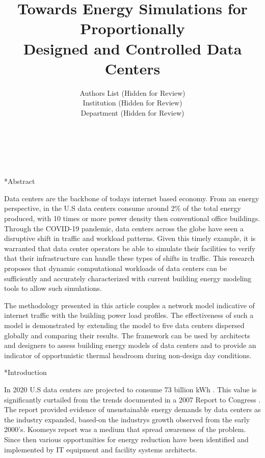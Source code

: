 \documentclass[twocolumn, a4paper,10pt]{article}
\title{%
Towards Energy Simulations for Proportionally  \\	%
\vspace{4pt}
Designed and Controlled Data Centers %
}
\author{
Authors List (Hidden for Review)\\ %
Institution (Hidden for Review) \\ %
Department (Hidden for Review)\\ %
  \\%
  \\ %
  \\ %
}
\date{\vspace{-0.5cm}}	%
\makeatletter
\renewcommand\section{\@startsection{section}{1}{\z@}{0.25cm}{0.1cm}{\normalfont\large\bfseries}}
\makeatother
\begin{document}
\maketitle

\section*{Abstract}	%

\addtocounter{section}{1}
Data centers are the backbone of today\textsc{}s internet based economy. From an energy perspective, in the U.S data centers consume around 2\% of the total energy produced, with 10 times or more power density then conventional office buildings. Through the COVID-19 pandemic, data centers across the globe have seen a disruptive shift in traffic and workload patterns. Given this timely example, it is warranted that data center operators be able to simulate their facilities to verify that their infrastructure can handle these types of shifts in traffic. This research proposes that dynamic computational workloads of data centers can be sufficiently and accurately characterized with current building energy modeling tools to allow such simulations.

The methodology presented in this article couples a network model indicative of internet traffic with the building power load profiles. The effectiveness of such a model is demonstrated by extending the model to five data centers dispersed globally and comparing their results. The framework can be used by architects and designers to assess building energy models of data centers and to provide an indicator of opportunistic thermal headroom during non-design day conditions. 


\section*{Introduction}

In 2020 U.S data centers are projected to consume 73 billion kWh \citep{Shehabi16}. This value is significantly curtailed from the trends documented in a 2007 Report to Congress \citep{koomey07}. The report provided evidence of unsustainable energy demands by data centers as the industry expanded, based-on the industry\textsc{}s growth observed from the early 2000’s. Koomey\textsc{}s report was a medium that spread awareness of the problem. Since then various opportunities for energy reduction have been identified and implemented by IT equipment and facility systems architects.
\end{document}

